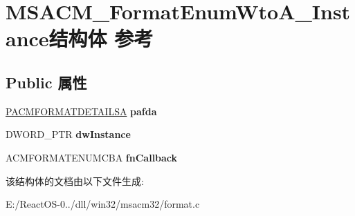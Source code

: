 \hypertarget{struct_m_s_a_c_m___format_enum_wto_a___instance}{}\section{M\+S\+A\+C\+M\+\_\+\+Format\+Enum\+Wto\+A\+\_\+\+Instance结构体 参考}
\label{struct_m_s_a_c_m___format_enum_wto_a___instance}
\subsection*{Public 属性}
\begin{DoxyCompactItemize}
\item 
\mbox{\label{struct_m_s_a_c_m___format_enum_wto_a___instance_adda6d82d19f4a45a35a4059738775f03}} 
\hyperlink{struct___a_c_m_f_o_r_m_a_t_d_e_t_a_i_l_s_a}{P\+A\+C\+M\+F\+O\+R\+M\+A\+T\+D\+E\+T\+A\+I\+L\+SA} {\bfseries pafda}
\item 
\mbox{\label{struct_m_s_a_c_m___format_enum_wto_a___instance_a49645f26607ef0d9e55870fa5f6e24fb}} 
D\+W\+O\+R\+D\+\_\+\+P\+TR {\bfseries dw\+Instance}
\item 
\mbox{\label{struct_m_s_a_c_m___format_enum_wto_a___instance_a761e59bb71e0f90945ac18e64a6cde16}} 
A\+C\+M\+F\+O\+R\+M\+A\+T\+E\+N\+U\+M\+C\+BA {\bfseries fn\+Callback}
\end{DoxyCompactItemize}


该结构体的文档由以下文件生成\+:\begin{DoxyCompactItemize}
\item 
E\+:/\+React\+O\+S-\/0../dll/win32/msacm32/format.\+c\end{DoxyCompactItemize}
